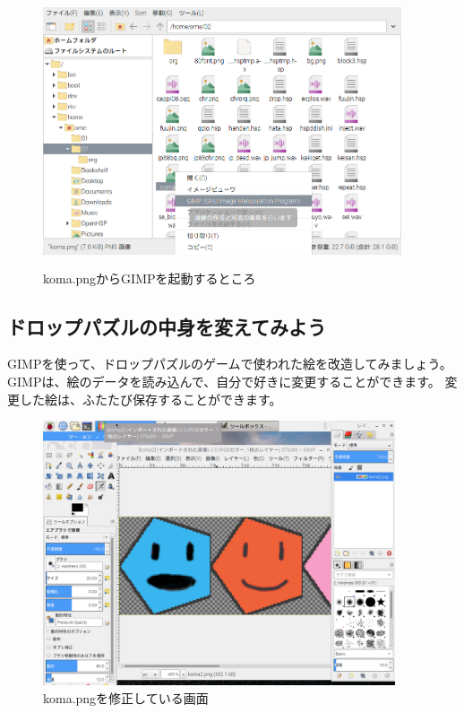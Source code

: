 \begin{figure}[H]
    \begin{center}
        \includegraphics[keepaspectratio,width=10.583cm,height=7.938cm]{text02-img/s_komapng.png}
        \caption{koma.pngからGIMPを起動するところ}
    \end{center}
\end{figure}

\subsection{ドロップパズルの中身を変えてみよう}

GIMPを使って、ドロップパズルのゲームで使われた絵を改造してみましょう。
GIMPは、絵のデータを読み込んで、自分で好きに変更することができます。
変更した絵は、ふたたび保存することができます。

\begin{figure}[H]
    \begin{center}
        \includegraphics[keepaspectratio,width=10.403cm,height=7.811cm]{text02-img/text02-img038.png}
        \caption{koma.pngを修正している画面}
    \end{center}
\end{figure}

